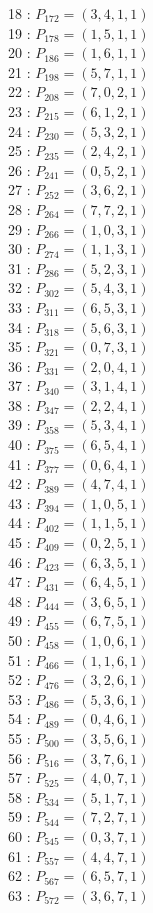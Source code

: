 \documentclass{article}
\begin{document}
{\begin{multicols}{2}
18 : $P_{172}=( 3, 4, 1, 1 )$\\
19 : $P_{178}=( 1, 5, 1, 1 )$\\
20 : $P_{186}=( 1, 6, 1, 1 )$\\
21 : $P_{198}=( 5, 7, 1, 1 )$\\
22 : $P_{208}=( 7, 0, 2, 1 )$\\
23 : $P_{215}=( 6, 1, 2, 1 )$\\
24 : $P_{230}=( 5, 3, 2, 1 )$\\
25 : $P_{235}=( 2, 4, 2, 1 )$\\
26 : $P_{241}=( 0, 5, 2, 1 )$\\
27 : $P_{252}=( 3, 6, 2, 1 )$\\
28 : $P_{264}=( 7, 7, 2, 1 )$\\
29 : $P_{266}=( 1, 0, 3, 1 )$\\
30 : $P_{274}=( 1, 1, 3, 1 )$\\
31 : $P_{286}=( 5, 2, 3, 1 )$\\
32 : $P_{302}=( 5, 4, 3, 1 )$\\
33 : $P_{311}=( 6, 5, 3, 1 )$\\
34 : $P_{318}=( 5, 6, 3, 1 )$\\
35 : $P_{321}=( 0, 7, 3, 1 )$\\
36 : $P_{331}=( 2, 0, 4, 1 )$\\
37 : $P_{340}=( 3, 1, 4, 1 )$\\
38 : $P_{347}=( 2, 2, 4, 1 )$\\
39 : $P_{358}=( 5, 3, 4, 1 )$\\
40 : $P_{375}=( 6, 5, 4, 1 )$\\
41 : $P_{377}=( 0, 6, 4, 1 )$\\
42 : $P_{389}=( 4, 7, 4, 1 )$\\
43 : $P_{394}=( 1, 0, 5, 1 )$\\
44 : $P_{402}=( 1, 1, 5, 1 )$\\
45 : $P_{409}=( 0, 2, 5, 1 )$\\
46 : $P_{423}=( 6, 3, 5, 1 )$\\
47 : $P_{431}=( 6, 4, 5, 1 )$\\
48 : $P_{444}=( 3, 6, 5, 1 )$\\
49 : $P_{455}=( 6, 7, 5, 1 )$\\
50 : $P_{458}=( 1, 0, 6, 1 )$\\
51 : $P_{466}=( 1, 1, 6, 1 )$\\
52 : $P_{476}=( 3, 2, 6, 1 )$\\
53 : $P_{486}=( 5, 3, 6, 1 )$\\
54 : $P_{489}=( 0, 4, 6, 1 )$\\
55 : $P_{500}=( 3, 5, 6, 1 )$\\
56 : $P_{516}=( 3, 7, 6, 1 )$\\
57 : $P_{525}=( 4, 0, 7, 1 )$\\
58 : $P_{534}=( 5, 1, 7, 1 )$\\
59 : $P_{544}=( 7, 2, 7, 1 )$\\
60 : $P_{545}=( 0, 3, 7, 1 )$\\
61 : $P_{557}=( 4, 4, 7, 1 )$\\
62 : $P_{567}=( 6, 5, 7, 1 )$\\
63 : $P_{572}=( 3, 6, 7, 1 )$\\
\end{multicols}
}
\end{document}

